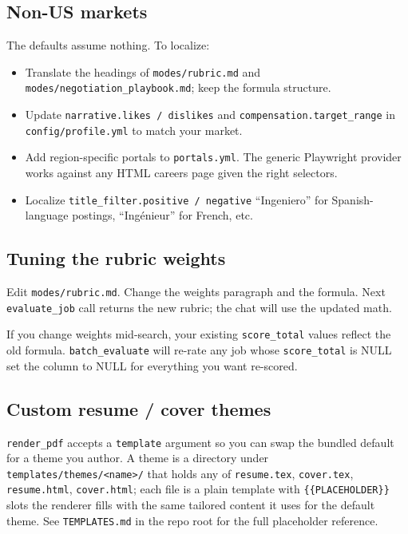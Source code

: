 \documentclass[11pt,letterpaper]{article}
\newcommand{\tool}[1]{\texttt{#1}}
\newcommand{\fpath}[1]{\texttt{#1}}
\begin{document}
\subsection*{Non-US markets}

The defaults assume nothing. To localize:

\begin{itemize}
\item Translate the headings of \fpath{modes/rubric.md} and \fpath{modes/negotiation\_playbook.md}; keep the formula structure.
\item Update \texttt{narrative.likes / dislikes} and \texttt{compensation.target\_range} in \fpath{config/profile.yml} to match your market.
\item Add region-specific portals to \fpath{portals.yml}. The generic Playwright provider works against any HTML careers page given the right selectors.
\item Localize \texttt{title\_filter.positive / negative} \textemdash{} ``Ingeniero'' for Spanish-language postings, ``Ingénieur'' for French, etc.
\end{itemize}

\subsection*{Tuning the rubric weights}

Edit \fpath{modes/rubric.md}. Change the weights paragraph and the formula. Next \texttt{evaluate\_job} call returns the new rubric; the chat will use the updated math.

\begin{tipbox}
If you change weights mid-search, your existing \texttt{score\_total} values reflect the old formula. \tool{batch\_evaluate} will re-rate any job whose \texttt{score\_total} is NULL \textemdash{} set the column to NULL for everything you want re-scored.
\end{tipbox}

\subsection*{Custom resume / cover themes}\label{sec:themes}

\tool{render\_pdf} accepts a \texttt{template} argument so you can swap the bundled default for a theme you author. A theme is a directory under \fpath{templates/themes/<name>/} that holds any of \fpath{resume.tex}, \fpath{cover.tex}, \fpath{resume.html}, \fpath{cover.html}; each file is a plain template with \texttt{\{\{PLACEHOLDER\}\}} slots the renderer fills with the same tailored content it uses for the default theme. See \fpath{TEMPLATES.md} in the repo root for the full placeholder reference.
\end{document}
